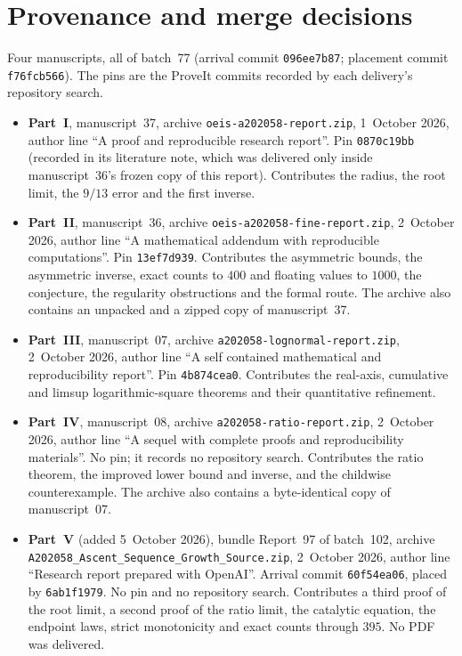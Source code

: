 \documentclass[11pt,letterpaper]{article}
\newcommand{\file}[1]{\nolinkurl{#1}}
\theoremstyle{remark}
\begin{document}
\section*{Provenance and merge decisions}\label{a58:sec:provenance}
Four manuscripts, all of batch~77 (arrival commit \texttt{096ee7b87}; placement commit \texttt{f76fcb566}). The pins are the ProveIt commits recorded by each delivery's repository search.
\begin{itemize}
\item \textbf{Part~I}, manuscript~37, archive \file{oeis-a202058-report.zip}, 1~October 2026, author line ``A proof and reproducible research report''. Pin \texttt{0870c19bb} (recorded in its literature note, which was delivered only inside manuscript~36's frozen copy of this report). Contributes the radius, the root limit, the $9/13$ error and the first inverse.
\item \textbf{Part~II}, manuscript~36, archive \file{oeis-a202058-fine-report.zip}, 2~October 2026, author line ``A mathematical addendum with reproducible computations''. Pin \texttt{13ef7d939}. Contributes the asymmetric bounds, the asymmetric inverse, exact counts to $400$ and floating values to $1000$, the conjecture, the regularity obstructions and the formal route. The archive also contains an unpacked and a zipped copy of manuscript~37.
\item \textbf{Part~III}, manuscript~07, archive \file{a202058-lognormal-report.zip}, 2~October 2026, author line ``A self contained mathematical and reproducibility report''. Pin \texttt{4b874cea0}. Contributes the real-axis, cumulative and limsup logarithmic-square theorems and their quantitative refinement.
\item \textbf{Part~IV}, manuscript~08, archive \file{a202058-ratio-report.zip}, 2~October 2026, author line ``A sequel with complete proofs and reproducibility materials''. No pin; it records no repository search. Contributes the ratio theorem, the improved lower bound and inverse, and the childwise counterexample. The archive also contains a byte-identical copy of manuscript~07.
\item \textbf{Part~V} (added 5~October 2026), bundle Report~97 of batch~102, archive \file{A202058_Ascent_Sequence_Growth_Source.zip}, 2~October 2026, author line ``Research report prepared with OpenAI''. Arrival commit \texttt{60f54ea06}, placed by \texttt{6ab1f1979}. No pin and no repository search. Contributes a third proof of the root limit, a second proof of the ratio limit, the catalytic equation, the endpoint laws, strict monotonicity and exact counts through $395$. No PDF was delivered.
\end{itemize}
\end{document}
